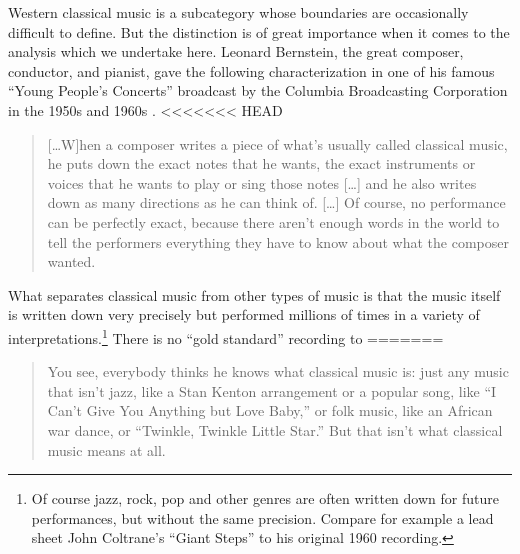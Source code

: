 \documentclass[aoas]{imsart}
\begin{document}
Western classical music is a subcategory
whose boundaries are occasionally difficult to define. But
the distinction is of great importance when it comes to the analysis
which we undertake here. Leonard Bernstein, the great composer,
conductor, and pianist, gave the following characterization in one of his famous
``Young People's Concerts''
broadcast by the Columbia Broadcasting Corporation in the 1950s and
1960s \citep{Bernstein2005}.
<<<<<<< HEAD
\begin{quote}
  [\ldots W]hen a composer
  writes a piece of what's usually called classical music, he puts down
  the exact notes that he wants, the exact instruments or voices that he
  wants to play or sing those notes [\ldots]
  and he also writes down as many directions as
  he can think of. [\ldots] Of course, no performance can be perfectly exact, because there
  aren't enough words in the world to tell the performers everything
  they have to know about what the composer wanted.
\end{quote}
What separates classical music from other types of music is that the
music itself is written down very precisely but performed millions of times in a
variety of interpretations.\footnote{Of course jazz, rock, pop and
  other genres are often written down for future performances, but
  without the same precision. Compare for example a lead sheet John
  Coltrane's ``Giant Steps'' to his original 1960 recording.}
There is no ``gold standard'' recording to
=======
\begin{quote}
  You see, everybody thinks he knows what classical music is: just any music that isn't jazz,
  like a Stan Kenton arrangement or a popular song, like ``I Can't Give
  You Anything but Love Baby,'' or folk music, like an African war
  dance, or ``Twinkle, Twinkle Little Star.'' But that isn't what
  classical music means at all.
\end{quote}
\end{document}
